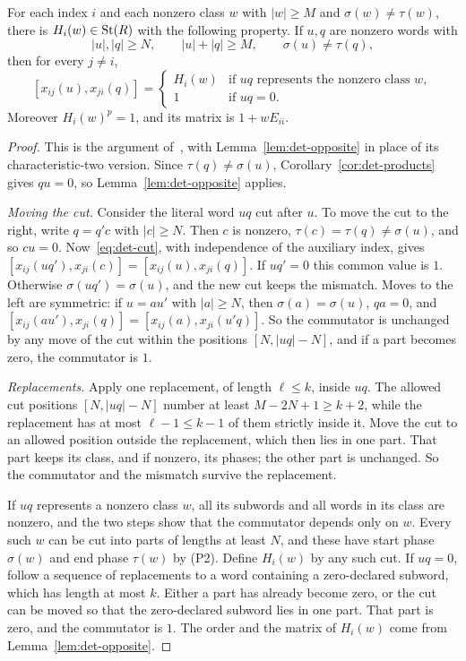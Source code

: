\begin{lemma}\label{lem:det-long}
For each index $i$ and each nonzero class $w$ with $|w|\geq M$ and $\sigma(w)\neq\tau(w)$, there is $H_i(w)\in\operatorname{St}(R)$
with the following property. If $u,q$ are nonzero words with
\[
 |u|,|q|\geq N,\qquad|u|+|q|\geq M,\qquad\sigma(u)\neq\tau(q),
\]
then for every $j\neq i$,
\[
 [x_{ij}(u),x_{ji}(q)]=\begin{cases}H_i(w)&\text{if }uq\text{ represents the nonzero class }w,\\ 1&\text{if }uq=0.\end{cases}
\]
Moreover $H_i(w)^p=1$, and its matrix is $1+wE_{ii}$.
\end{lemma}

\begin{proof}
This is the argument of~\cite{OAI247rf}, with Lemma~\ref{lem:det-opposite} in place of its characteristic-two version.
Since $\tau(q)\neq\sigma(u)$, Corollary~\ref{cor:det-products} gives $qu=0$, so Lemma~\ref{lem:det-opposite} applies.

\emph{Moving the cut.} Consider the literal word $uq$ cut after $u$. To move the cut to the right, write $q=q'c$ with
$|c|\geq N$. Then $c$ is nonzero, $\tau(c)=\tau(q)\neq\sigma(u)$, and so $cu=0$. Now~\eqref{eq:det-cut}, with independence
of the auxiliary index, gives $[x_{ij}(uq'),x_{ji}(c)]=[x_{ij}(u),x_{ji}(q)]$. If $uq'=0$ this common value is $1$.
Otherwise $\sigma(uq')=\sigma(u)$, and the new cut keeps the mismatch. Moves to the left are symmetric: if $u=au'$ with
$|a|\geq N$, then $\sigma(a)=\sigma(u)$, $qa=0$, and $[x_{ij}(au'),x_{ji}(q)]=[x_{ij}(a),x_{ji}(u'q)]$. So the commutator is
unchanged by any move of the cut within the positions $[N,|uq|-N]$, and if a part becomes zero, the commutator is $1$.

\emph{Replacements.} Apply one replacement, of length $\ell\leq k$, inside $uq$. The allowed cut positions $[N,|uq|-N]$
number at least $M-2N+1\geq k+2$, while the replacement has at most $\ell-1\leq k-1$ of them strictly inside it. Move the
cut to an allowed position outside the replacement, which then lies in one part. That part keeps its class, and if
nonzero, its phases; the other part is unchanged. So the commutator and the mismatch survive the replacement.

If $uq$ represents a nonzero class $w$, all its subwords and all words in its class are nonzero, and the two steps show
that the commutator depends only on $w$. Every such $w$ can be cut into parts of lengths at least $N$, and these have
start phase $\sigma(w)$ and end phase $\tau(w)$ by (P2). Define $H_i(w)$ by any such cut. If $uq=0$, follow a sequence of
replacements to a word containing a zero-declared subword, which has length at most $k$. Either a part has already
become zero, or the cut can be moved so that the zero-declared subword lies in one part. That part is zero, and the
commutator is $1$. The order and the matrix of $H_i(w)$ come from Lemma~\ref{lem:det-opposite}.
\end{proof}

